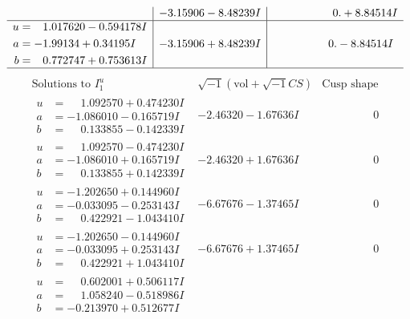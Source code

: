 \documentclass[1p]{elsarticle_modified}
\theoremstyle{definition}
\newcommand{\I}{\sqrt{-1}}
\begin{document}
$$\begin{array}{c|c|c}
 & -3.15906 - 8.48239 I & \phantom{-0.000000 -}0. + 8.84514 I \\ \hline\begin{aligned}
u &= \phantom{-}1.017620 - 0.594178 I \\
a &= -1.99134 + 0.34195 I \\
b &= \phantom{-}0.772747 + 0.753613 I\end{aligned}
 & -3.15906 + 8.48239 I & \phantom{-0.000000 } 0. - 8.84514 I\\
 \hline 
 \end{array}$$\newpage$$\begin{array}{c|c|c}  
\text{Solutions to }I^u_{1}& \I (\text{vol} + \sqrt{-1}CS) & \text{Cusp shape}\\
 \hline 
\begin{aligned}
u &= \phantom{-}1.092570 + 0.474230 I \\
a &= -1.086010 - 0.165719 I \\
b &= \phantom{-}0.133855 - 0.142339 I\end{aligned}
 & -2.46320 - 1.67636 I & \phantom{-0.000000 } 0 \\ \hline\begin{aligned}
u &= \phantom{-}1.092570 - 0.474230 I \\
a &= -1.086010 + 0.165719 I \\
b &= \phantom{-}0.133855 + 0.142339 I\end{aligned}
 & -2.46320 + 1.67636 I & \phantom{-0.000000 } 0 \\ \hline\begin{aligned}
u &= -1.202650 + 0.144960 I \\
a &= -0.033095 - 0.253143 I \\
b &= \phantom{-}0.422921 - 1.043410 I\end{aligned}
 & -6.67676 - 1.37465 I & \phantom{-0.000000 } 0 \\ \hline\begin{aligned}
u &= -1.202650 - 0.144960 I \\
a &= -0.033095 + 0.253143 I \\
b &= \phantom{-}0.422921 + 1.043410 I\end{aligned}
 & -6.67676 + 1.37465 I & \phantom{-0.000000 } 0 \\ \hline\begin{aligned}
u &= \phantom{-}0.602001 + 0.506117 I \\
a &= \phantom{-}1.058240 - 0.518986 I \\
b &= -0.213970 + 0.512677 I\end{aligned}

\end{array}$$
\end{document}
